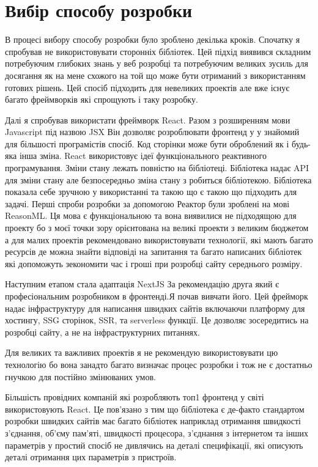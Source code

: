\newpage
\section{Вибір способу розробки}
В процесі вибору способу розробки було зроблено декілька кроків.
Спочатку я спробував не використовувати сторонніх бібліотек.
Цей підхід виявився складним потребуючим глибоких знань у веб розробці та потребуючим великих зусиль для досягання
як на мене схожого на той що може бути отриманий з використанням готових рішень.
Цей спосіб підходить для невеликих проектів але вже існує багато фреймворків які спрощують і таку розробку.

Далі я спробував використати фреймворк React.
Разом з розширенням мови Javascript під назвою JSX Він дозволяє розроблювати фронтенд у у знайомий для більшості програмістів спосіб.
Код сторінки може бути оброблений як і будь-яка інша зміна.
React використовує ідеї функціонального реактивного програмування.
Зміни стану лежать повністю на бібліотеці.
Бібліотека надає API для зміни стану але безпосередньо зміна стану з робиться бібліотекою.
Бібліотека показала себе зручною у використанні та такою що є такою що підходить для задачі.
Перші спроби розробки за допомогою Реактор були зроблені на мові ReasonML.
Ця мова є функціональною та вона виявилися не підходящою для проекту бо з моєї точки зору орієнтована
на великі проекти з великим бюджетом а для малих проектів рекомендовано використовувати технології,
які мають багато ресурсів де можна знайти відповіді на запитання та багато написаних
бібліотек які допоможуть зекономити час і гроші при розробці сайту середнього розміру.

Наступним етапом стала адаптація NextJS За рекомендацію друга який є професіональним розробником в фронтенді.Я почав вивчати його.
Цей фрейморк надає інфраструктуру для написання швидких сайтів включаючи платформу для хостингу, SSG сторінок, SSR, та serverless функції.
Це дозволяє зосередитись на розробці сайту, а не на інфраструктурних питаннях.

Для великих та важливих проектів я не рекомендую використовувати цю технологію бо вона занадто
багато визначає процес розробки і тож не є достатньо гнучкою для постійно змінюваних умов.

Більшість провідних компаній які розробляють топ1 фронтенд у світі використовують React.
Це пов'язано з тим що бібліотека є де-факто стандартом розробки швидких сайтів має багато
бібліотек наприклад отримання швидкості з'єднання, об'єму пам'яті, швидкості процесора,
з'єднання з інтернетом та інших параметрів у простий спосіб не дивлячись на деталі специфікації,
які описують деталі отримання цих параметрів з пристроїв.
